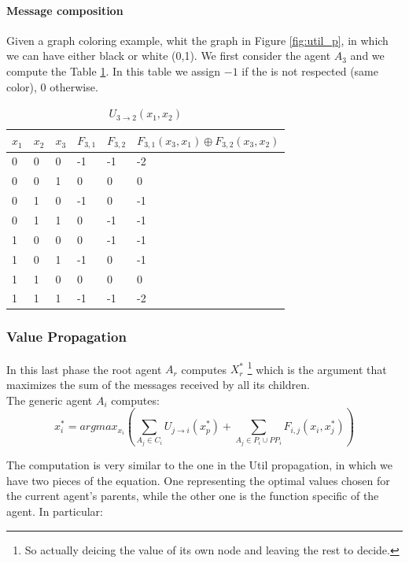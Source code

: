 \documentclass[10pt,a4paper]{article}
\begin{document}
\paragraph{Message composition}
Given a graph coloring example, whit the graph in Figure \ref{fig:util_p}, in which we can have either black or white (0,1). We first consider the agent $A_3$ and we compute the Table \ref{tab:u32}. In this table we assign $-1$ if the is not respected (same color), $0$ otherwise.

\begin{table}[H]
\centering
\begin{tabular}{|l|l|l|l|l|l|}
\hline
$x_1$ & $x_2$ & $x_3$ &$F_{3,1}$  & $F_{3,2}$ &$F_{3,1}(x_3,x_1) \oplus F_{3,2}(x_3,x_2)$ \\ \hline
0 & 0 & 0 & -1 & -1 &-2  \\ \hline
\rowcolor{Gainsboro!60}
0 & 0 & 1 & 0 &  0& 0 \\ \hline
0 & 1 & 0 & -1 & 0 &-1  \\ \hline
0 & 1 & 1 & 0 &  -1& -1 \\ \hline
1 & 0 & 0 & 0 &  -1&-1  \\ \hline
1 & 0 & 1 & -1 &0  &-1  \\ \hline
\rowcolor{Gainsboro!60}
1 & 1 & 0 & 0 & 0 & 0 \\ \hline
1 & 1 & 1 & -1 & -1 & -2 \\ \hline
\end{tabular}
\caption{$U_{3 \rightarrow 2}(x_1,x_2)$}
\label{tab:u32}
\end{table}

\subsubsection{Value Propagation}
In this last phase the root agent $A_r$ computes $X_r^*$ \footnote{So actually deicing the value of its own node and leaving the rest to decide.} which is the argument that maximizes the sum of the messages received by all its children.\\
The generic agent $A_i$ computes:
\[x_i^*=argmax_{x_i}(\sum_{A_j \in C_i}U_{j\rightarrow i}(x_p^*)+\sum_{A_j \in P_i \cup PP_i}F_{i,j}(x_i,x_j^*))\]

The computation is very similar to the one in the Util propagation, in which we have two pieces of the equation. One representing the optimal values chosen for the current agent's parents, while the other one is the function specific of the agent. In particular:
\end{document}

